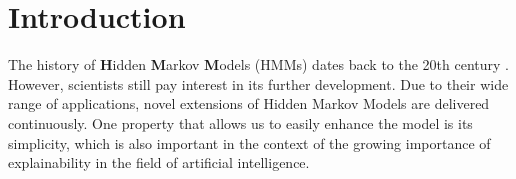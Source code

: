 \documentclass[shortabstract]{iithesis}
\begin{document}

\setcounter{tocdepth}{1}
\tableofcontents






\chapter{Introduction}

The history of \textbf{H}idden \textbf{M}arkov \textbf{M}odels (HMMs) dates back to the 20th century \cite{mor_systematic_2021}. However, scientists still pay interest in its further development. Due to their wide range of applications, novel extensions of Hidden Markov Models are delivered continuously. One property that allows us to easily enhance the model is its simplicity, which is also important in the context of the growing importance of explainability in the field of artificial intelligence.
\end{document}
